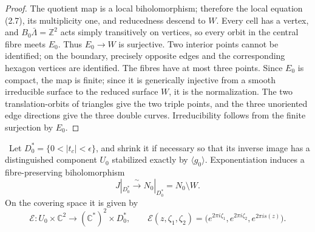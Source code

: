 \begin{proof}
The quotient map is a local biholomorphism; therefore the local equation
(2.7), its multiplicity one, and reducedness descend to \(W\).  Every cell
has a vertex, and \(B_0\bar\Lambda=\mathbb Z^2\) acts simply transitively on
vertices, so every orbit in the central fibre meets \(E_0\).  Thus
\(E_0\to W\) is surjective.  Two interior points cannot be identified; on
the boundary, precisely opposite edges and the corresponding hexagon
vertices are identified.  The fibres have at most three points.  Since
\(E_0\) is compact, the map is finite; since it is generically injective
from a smooth irreducible surface to the reduced surface \(W\), it is the
normalization.  The two translation-orbits of triangles give the two triple
points, and the three unoriented edge directions give the three double
curves.  Irreducibility follows from the finite surjection by \(E_0\).
\end{proof}

\begin{proposition}
\label{prop:candidate-cusp-overlap}
\Verified\ Let \(D_0^*=\{0<|t_c|<\epsilon\}\), and shrink it if necessary
so that its inverse image has a distinguished component \(U_0\) stabilized
exactly by \(\langle g_0\rangle\).  Exponentiation induces a
fibre-preserving biholomorphism
\[
 J|_{D_0^*}\xrightarrow{\ \sim\ }
 N_0|_{D_0^*}=N_0\setminus W.
\tag{2.8i}
\]
On the covering space it is given by
\[
 \mathcal E:U_0\times\mathbb C^2\longrightarrow
             (\mathbb C^*)^2\times D_0^*,
 \qquad
 \mathcal E(z,\zeta_1,\zeta_2)
 =\bigl(e^{2\pi i\zeta_1},e^{2\pi i\zeta_2},e^{2\pi is(z)}\bigr).
\tag{2.8ii}
\]
\end{proposition}

